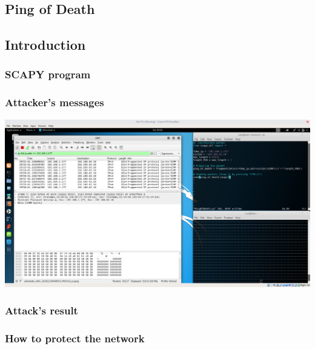 \subsection{Ping of Death}
\subsection{Introduction}


\subsubsection{SCAPY program}


\subsubsection{Attacker's messages}
\includegraphics[width=16cm]{img/PingOfDeath.png}

\subsubsection{Attack's result}


\subsubsection{How to protect the network}

